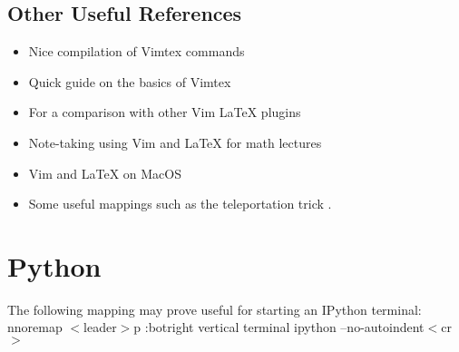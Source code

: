 \documentclass[10pt]{article}
\newcommand{\tlangle}{$<$}
\newcommand{\trangle}{$>$}
\begin{document}
\subsection{Other Useful References}
\begin{itemize}
    \item Nice compilation of Vimtex commands \cite{gunther2014vimtex}
    \item Quick guide on the basics of Vimtex \cite{jdhao2019complete}
    \item For a comparison with other Vim LaTeX plugins \cite{lervag2015vim}
    \item Note-taking using Vim and LaTeX for math lectures \cite{castel2019how}
    \item Vim and LaTeX on MacOS \cite{dyke2020getting}
    \item Some useful mappings such as the teleportation trick \cite{smith2016my, smith2017start}. 
\end{itemize}

\section{Python}
The following mapping may prove useful for starting an IPython terminal:\\ 
nnoremap \tlangle leader\trangle p :botright vertical terminal ipython --no-autoindent\tlangle cr\trangle
\end{document}

